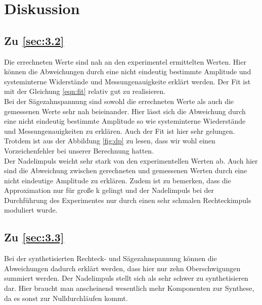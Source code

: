 \section{Diskussion}
\label{sec:Diskussion}

\subsection{Zu \ref{sec:3.2}}
Die errechneten Werte sind nah an den experimentel ermittelten Werten.
Hier können die Abweichungen durch eine nicht eindeutig bestimmte Amplitude und
systeminterne Widerstände und Messungenauigkeite erklärt werden. Der Fit
ist mit der Gleichung \eqref{eqn:fit} relativ gut
 zu realisieren. \\
 Bei der Sägezahnspannung sind sowohl die errechneten Werte als auch die gemessenen
 Werte sehr nah beieinander. Hier lässt sich die Abweichung durch eine nicht eindeutig
 bestimmte Amplitude so wie systeminterne Wiederstände und
 Messungenauigkeiten zu erklären. Auch der Fit ist hier sehr gelungen. Trotdem
 ist aus der Abbildung \ref{fig:dp} zu lesen, dass wir wohl einen Vorzeichenfehler
  bei unserer Berechnung hatten. \\
 Der Nadelimpuls weicht sehr stark von den experimentellen Werten ab. Auch hier sind die
  Abweichung zwischen gerechneten und gemessenen Werten durch eine nicht
  eindeutige Amplitude zu erklären. Zudem ist zu bemerken, dass die
  Approximation nur für große k gelingt und der Nadelimpuls bei der Durchführung
  des Experimentes nur durch einen sehr schmalen Rechteckimpuls moduliert wurde.

\subsection{Zu \ref{sec:3.3}}
Bei der synthetisierten Rechteck- und Sägezahnspannung können die Abweichungen
dadurch erklärt werden, dass hier nur zehn Oberschwigungen summiert werden.
Der Nadelimpuls stellt sich als sehr schwer zu synthetisieren dar. Hier braucht
man anscheinend wesentlich mehr Komponenten zur Synthese, da es sonst zur Nulldurchläufen
kommt.
